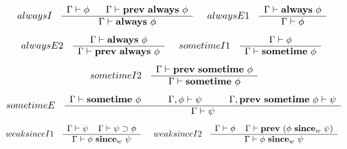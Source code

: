 \[
\begin{array}{ccc}
{\sc alwaysI}
&
\begin{array}{c}
\Gamma\vdash \phi \hspace*{0.6cm} \Gamma \vdash \mathbf{prev}\ \mathbf{always}\ \phi \\ \hline
\Gamma \vdash \mathbf{always}\ \phi
\end{array}
&
\begin{array}{cc}
{\sc alwaysE1}
&
\begin{array}{c}
\Gamma\vdash \mathbf{always}\ \phi \\ \hline
\Gamma \vdash \phi
\end{array}
\end{array}
\end{array}
\]
\[
\begin{array}{ccc}
{\sc alwaysE2}
&
\begin{array}{c}
\Gamma\vdash \mathbf{always}\ \phi \\ \hline
\Gamma \vdash \mathbf{prev}\ \mathbf{always}\ \phi
\end{array}
&
\begin{array}{cc}
{\sc sometimeI1}
&
\begin{array}{c}
\Gamma\vdash \phi  \\ \hline
\Gamma \vdash \mathbf{sometime}\ \phi
\end{array}
\end{array}
\end{array}
\]
\[
\begin{array}{cc}
{\sc sometimeI2}
&
\begin{array}{c}
\Gamma\vdash \mathbf{prev}\ \mathbf{sometime}\ \phi \\ \hline
\Gamma \vdash \mathbf{sometime}\ \phi
\end{array}
\end{array}
\]
\[
\begin{array}{cc}
{\sc sometimeE}
&
\begin{array}{c}
\Gamma\vdash \mathbf{sometime}\ \phi \hspace*{1cm} \Gamma,\phi \vdash \psi \hspace*{1cm} \Gamma,\mathbf{prev}\ \mathbf{sometime}\ \phi \vdash \psi \\ \hline
\Gamma \vdash \psi
\end{array}
\end{array}
\]
\[
\begin{array}{ccc}
{\sc weaksinceI1}
&
\begin{array}{c}
\Gamma\vdash \psi \hspace*{0.4cm} \Gamma\vdash \psi \Implies \phi \\ \hline
\Gamma \vdash \phi\ \Since_w\ \psi
\end{array}
&
\begin{array}{cc}
{\sc weaksinceI2}
&
\begin{array}{c}
\Gamma\vdash \phi \hspace*{0.4cm} \Gamma \vdash \Prev\ (\phi\ \Since_w\ \psi) \\ \hline
\Gamma \vdash \phi\ \Since_w\ \psi
\end{array}
\end{array}
\end{array}
\]

